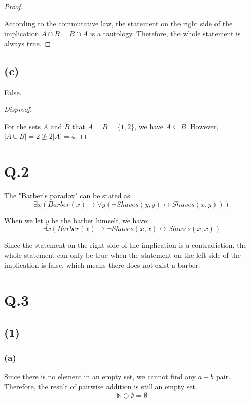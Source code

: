 \documentclass[a4paper,12pt]{article}
\begin{document}
\begin{proof}
$ $

According to the commutative law, the statement on the right side of the implication $A \cap B = B \cap A$ is a tautology.
Therefore, the whole statement is always true.
\end{proof}

\subsection*{(c)}
False.

\begin{proof}[Disproof]
$ $

For the sets $A$ and $B$ that $A = B = \{1, 2\}$, we have $A \subseteq B$.
However, $|A \cup B| = 2 \not\geq 2|A| = 4$.
\end{proof}

\section*{Q.2}

The "Barber's paradox" can be stated as:
\begin{equation*}
	\exists x (Barber(x) \rightarrow \forall y (\neg Shaves(y, y) \leftrightarrow Shaves(x, y)))
\end{equation*}

When we let $y$ be the barber himself, we have:
\begin{equation*}
	\exists x (Barber(x) \rightarrow \neg Shaves(x, x) \leftrightarrow Shaves(x, x))
\end{equation*}

Since the statement on the right side of the implication is a contradiction, the whole statement can only be true when the statement on the left side of the implication is false, which means there does not exist a barber.

\section*{Q.3}

\subsection*{(1)}

\subsubsection*{(a)}
Since there is no element in an empty set, we cannot find any $a + b$ pair. 
Therefore, the result of pairwise addition is still an empty set.
\begin{equation*}
	\mathbb{N} \oplus \emptyset = \emptyset
\end{equation*}
\end{document}
